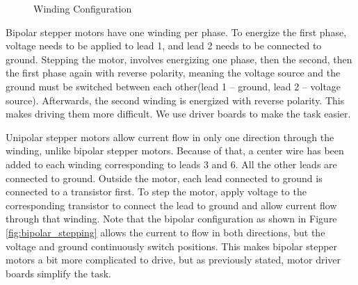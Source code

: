 \begin{figure}[htp] 
    \centering
    \hfill
    \caption{Winding Configuration}
    \label{fig:windings}
\end{figure}

Bipolar stepper motors have one winding per phase. To energize the first phase, voltage needs to 
be applied to lead 1, and lead 2 needs to be connected to ground. Stepping the motor, 
involves energizing one phase, then the second, then the first phase again with reverse
polarity, meaning the voltage source and the ground must be switched between each other(lead 1 – 
ground, lead 2 – voltage source). Afterwards, the second winding is energized with reverse 
polarity. This makes driving them more difficult. We use driver boards to make the task easier. 

Unipolar stepper motors allow current flow in only one direction through the winding, unlike 
bipolar stepper motors. Because of that, a center wire has been added to each winding corresponding 
to leads 3 and 6. All the other leads are connected to ground. Outside the motor, each lead 
connected to ground is connected to a transistor first. To step the motor, apply voltage to 
the corresponding transistor to connect the lead to ground and allow current flow 
through that winding.  
\newpage
Note that the bipolar configuration as shown in Figure \ref{fig:bipolar_stepping} allows the 
current to flow in both directions, but the voltage and ground continuously switch positions. This 
makes bipolar stepper motors a bit more complicated to drive, but as previously stated, motor 
driver boards simplify the task.

